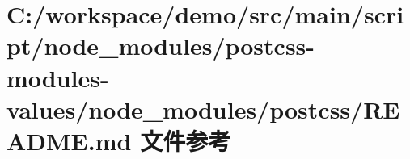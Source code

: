 \hypertarget{node__modules_2postcss-modules-values_2node__modules_2postcss_2_r_e_a_d_m_e_8md}{}\section{C\+:/workspace/demo/src/main/script/node\+\_\+modules/postcss-\/modules-\/values/node\+\_\+modules/postcss/\+R\+E\+A\+D\+ME.md 文件参考}
\label{node__modules_2postcss-modules-values_2node__modules_2postcss_2_r_e_a_d_m_e_8md}
